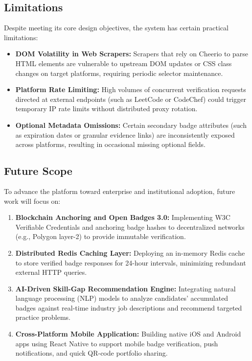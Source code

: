 \documentclass[12pt,a4paper]{article}
\begin{document}
\subsection{Limitations}
Despite meeting its core design objectives, the system has certain practical limitations:
\begin{itemize}[leftmargin=*]
    \item \textbf{DOM Volatility in Web Scrapers:} Scrapers that rely on Cheerio to parse HTML elements are vulnerable to upstream DOM updates or CSS class changes on target platforms, requiring periodic selector maintenance.
    \item \textbf{Platform Rate Limiting:} High volumes of concurrent verification requests directed at external endpoints (such as LeetCode or CodeChef) could trigger temporary IP rate limits without distributed proxy rotation.
    \item \textbf{Optional Metadata Omissions:} Certain secondary badge attributes (such as expiration dates or granular evidence links) are inconsistently exposed across platforms, resulting in occasional missing optional fields.
\end{itemize}

\subsection{Future Scope}
To advance the platform toward enterprise and institutional adoption, future work will focus on:
\begin{enumerate}[leftmargin=*]
    \item \textbf{Blockchain Anchoring and Open Badges 3.0:} Implementing W3C Verifiable Credentials and anchoring badge hashes to decentralized networks (e.g., Polygon layer-2) to provide immutable verification.
    \item \textbf{Distributed Redis Caching Layer:} Deploying an in-memory Redis cache to store verified badge responses for 24-hour intervals, minimizing redundant external HTTP queries.
    \item \textbf{AI-Driven Skill-Gap Recommendation Engine:} Integrating natural language processing (NLP) models to analyze candidates' accumulated badges against real-time industry job descriptions and recommend targeted practice problems.
    \item \textbf{Cross-Platform Mobile Application:} Building native iOS and Android apps using React Native to support mobile badge verification, push notifications, and quick QR-code portfolio sharing.
\end{enumerate}
\end{document}
